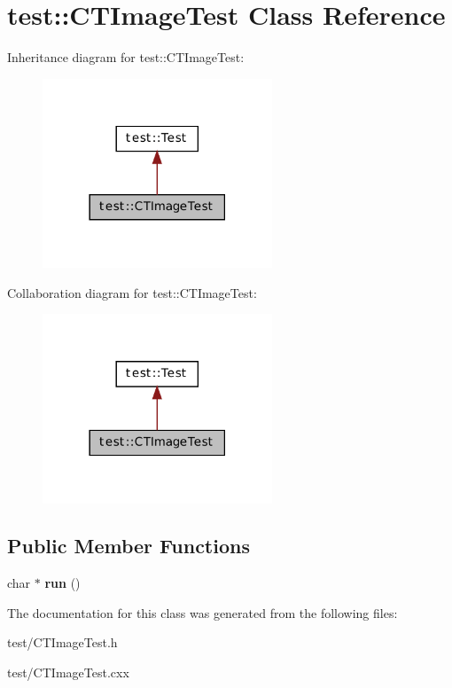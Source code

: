 \hypertarget{classtest_1_1_c_t_image_test}{
\section{test::CTImageTest Class Reference}
\label{classtest_1_1_c_t_image_test}
}


Inheritance diagram for test::CTImageTest:\nopagebreak
\begin{figure}[H]
\begin{center}
\leavevmode
\includegraphics[width=194pt]{classtest_1_1_c_t_image_test__inherit__graph}
\end{center}
\end{figure}


Collaboration diagram for test::CTImageTest:\nopagebreak
\begin{figure}[H]
\begin{center}
\leavevmode
\includegraphics[width=194pt]{classtest_1_1_c_t_image_test__coll__graph}
\end{center}
\end{figure}
\subsection*{Public Member Functions}
\begin{DoxyCompactItemize}
\item 
\hypertarget{classtest_1_1_c_t_image_test_a6142b3c1a81dc80d2918933f45b2210b}{
char $\ast$ {\bfseries run} ()}
\label{classtest_1_1_c_t_image_test_a6142b3c1a81dc80d2918933f45b2210b}

\end{DoxyCompactItemize}


The documentation for this class was generated from the following files:\begin{DoxyCompactItemize}
\item 
test/CTImageTest.h\item 
test/CTImageTest.cxx\end{DoxyCompactItemize}

